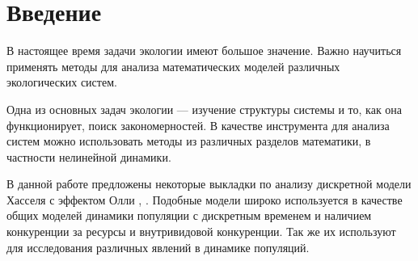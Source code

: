 \section{Введение}

    В настоящее время задачи экологии имеют большое значение. Важно научиться применять методы для анализа математических моделей различных экологических систем. 
    
    Одна из основных задач экологии --- изучение структуры системы и то, как она функционирует, поиск закономерностей. В качестве инструмента для анализа систем можно использовать методы из различных разделов математики, в частности нелинейной динамики.
    
    В данной работе предложены некоторые выкладки по анализу дискретной модели Хасселя с эффектом Олли \cite{densityDependenceInSingleSpeciesPopulations}, \cite{inequalityInResourceAllocationAndPopulationDynamicsModels}. Подобные модели широко используется в качестве общих моделей динамики популяции с дискретным временем и наличием конкуренции за ресурсы и внутривидовой конкуренции. Так же их используют для исследования различных явлений в динамике популяций.